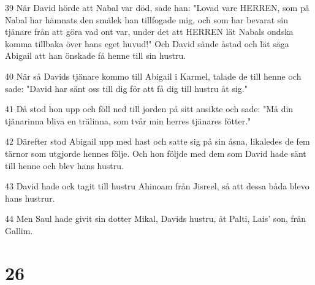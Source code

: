 \par 39 När David hörde att Nabal var död, sade han: "Lovad vare HERREN, som på Nabal har hämnats den smälek han tillfogade mig, och som har bevarat sin tjänare från att göra vad ont var, under det att HERREN lät Nabals ondska komma tillbaka över hans eget huvud!" Och David sände åstad och lät säga Abigail att han önskade få henne till sin hustru.
\par 40 När så Davids tjänare kommo till Abigail i Karmel, talade de till henne och sade: "David har sänt oss till dig för att få dig till hustru åt sig."
\par 41 Då stod hon upp och föll ned till jorden på sitt ansikte och sade: "Må din tjänarinna bliva en trälinna, som tvår min herres tjänares fötter."
\par 42 Därefter stod Abigail upp med hast och satte sig på sin åsna, likaledes de fem tärnor som utgjorde hennes följe. Och hon följde med dem som David hade sänt till henne och blev hans hustru.
\par 43 David hade ock tagit till hustru Ahinoam från Jisreel, så att dessa båda blevo hans hustrur.
\par 44 Men Saul hade givit sin dotter Mikal, Davids hustru, åt Palti, Lais' son, från Gallim.

\chapter{26}

